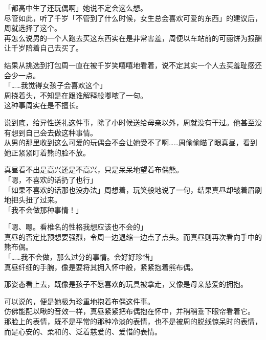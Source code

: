 「都高中生了还玩偶啊」她说不定会这么想。\\

尽管如此，听了千岁「不管到了什么时候，女生总会喜欢可爱的东西」的建议后，周就选择了这个。\\

再怎么说男的一个人跑去买这东西实在是非常害羞，周便以车站前的可丽饼为报酬让千岁陪着自己去买了。

结果从挑选到打包周一直在被千岁笑嘻嘻地看着，说不定其实一个人去买羞耻感还会少一点。\\

「……我觉得女孩子会喜欢这个」\\

周挠着头，不知是在跟谁解释般嘟哝了一句。\\

这种事周实在是不擅长。

说到底，给异性送礼这件事，除了小时候送给母亲以外，周就没有干过。他甚至没有想到自己会去做这种事情。\\

从男的那里收到这么可爱的玩偶会不会让她受不了啊……周偷偷瞄了眼真昼，看到她正紧紧盯着熊的脸不放。

真昼看不出是高兴还是不高兴，只是呆呆地望着布偶熊。\\

「嗯，不喜欢的话扔了也行」\\

「如果不喜欢的话那也没办法」周想着，玩笑般地说了一句，结果真昼却皱着眉刷地把头扭了过来。\\

「我不会做那种事情！」

「嗯、嗯。看椎名的性格我想应该也不会的」\\

真昼的否定比预想要强烈，令周一边退缩一边点了点头。而真昼则再次看向手中的熊布偶。\\

「……我不会做，那么过分的事情。会好好珍惜」\\

真昼纤细的手腕，像是要将其拥入怀中般，紧紧抱着熊布偶。

那姿态看上去，既像是孩子不愿喜欢的玩具被拿走，又像是母亲慈爱的拥抱。

可以说的，便是她极为珍重地抱着布偶这件事。\\

仿佛能配以啾的音效一样，真昼紧紧把布偶抱在怀中，并稍稍垂下眼帘看着它。\\

那脸上的表情，既不是平常的那种冷淡的表情，也不是被周的脱线惊呆时的表情，而是心安的、柔和的、泛着慈爱的、爱惜的表情。

